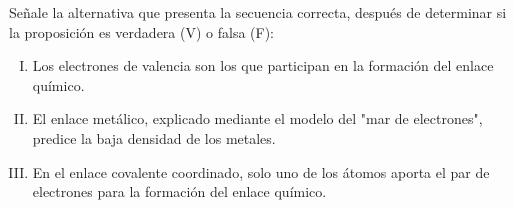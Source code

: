 Señale la alternativa que presenta la secuencia correcta, después de determinar si la proposición es verdadera (V) o falsa (F):
\begin{enumerate}[I.]
	\item Los electrones de valencia son los que participan en la formación del enlace químico.
	\item El enlace metálico, explicado mediante el modelo del "mar de electrones", predice la baja densidad de los metales.
	\item En el enlace covalente coordinado, solo uno de los átomos aporta el par de electrones para la formación del enlace químico.
\end{enumerate}
